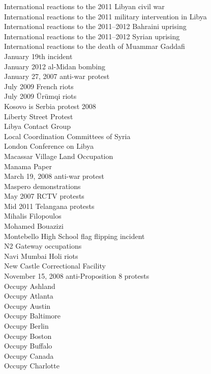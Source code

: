 International reactions to the 2011 Libyan civil war\\
International reactions to the 2011 military intervention in Libya\\
International reactions to the 2011–2012 Bahraini uprising\\
International reactions to the 2011–2012 Syrian uprising\\
International reactions to the death of Muammar Gaddafi\\
January 19th incident\\
January 2012 al-Midan bombing\\
January 27, 2007 anti-war protest\\
July 2009 French riots\\
July 2009 Ürümqi riots\\
Kosovo is Serbia protest 2008\\
Liberty Street Protest\\
Libya Contact Group\\
Local Coordination Committees of Syria\\
London Conference on Libya\\
Macassar Village Land Occupation\\
Manama Paper\\
March 19, 2008 anti-war protest\\
Maspero demonstrations\\
May 2007 RCTV protests\\
Mid 2011 Telangana protests\\
Mihalis Filopoulos\\
Mohamed Bouazizi\\
Montebello High School flag flipping incident\\
N2 Gateway occupations\\
Navi Mumbai Holi riots\\
New Castle Correctional Facility\\
November 15, 2008 anti-Proposition 8 protests\\
Occupy Ashland\\
Occupy Atlanta\\
Occupy Austin\\
Occupy Baltimore\\
Occupy Berlin\\
Occupy Boston\\
Occupy Buffalo\\
Occupy Canada\\
Occupy Charlotte\\
